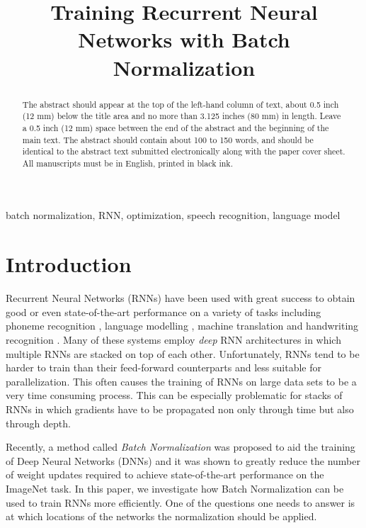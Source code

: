 \documentclass{article}
\title{Training Recurrent Neural Networks with Batch Normalization}
\begin{document}
%
\maketitle
%
\begin{abstract}
The abstract should appear at the top of the left-hand column of text, about
0.5 inch (12 mm) below the title area and no more than 3.125 inches (80 mm) in
length.  Leave a 0.5 inch (12 mm) space between the end of the abstract and the
beginning of the main text.  The abstract should contain about 100 to 150
words, and should be identical to the abstract text submitted electronically
along with the paper cover sheet.  All manuscripts must be in English, printed
in black ink.
\end{abstract}
%
\begin{keywords}
batch normalization, RNN, optimization, speech recognition, language model
\end{keywords}
%
\section{Introduction}

Recurrent Neural Networks (RNNs) have been used with great success to
obtain good or even state-of-the-art performance on a variety of tasks including phoneme
recognition \citep{graves2013speech}, language modelling
\citep{mikolov2012thesis}, machine translation
\citep{sutskever2014sequence,bahdanau2014,cho2014properties,kalchbrenner2013}
and handwriting recognition \citep{graves2009offline}.
Many of these systems employ \emph{deep} RNN architectures in which multiple
RNNs are stacked on top of each other.
Unfortunately, RNNs tend to be harder to train than their feed-forward
counterparts and less suitable for parallelization. This often causes the
training of RNNs on large data sets to be a very time consuming process.
This can be especially problematic for stacks of RNNs in which gradients have
to be propagated non only through time but also through depth.

Recently, a method called \emph{Batch Normalization} was proposed to aid the
training of Deep Neural Networks (DNNs) \citep{ioffe2015} and it was shown to
greatly reduce the number of weight updates required to achieve
state-of-the-art performance on the ImageNet task.
In this paper, we investigate how Batch Normalization can be used to train RNNs
more efficiently. One of the questions one needs to answer is at which
locations of the networks the normalization should be applied.
\end{document}
